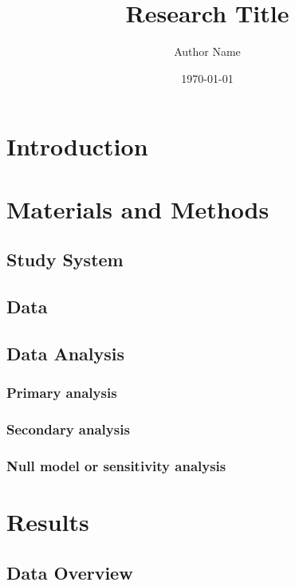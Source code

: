 \documentclass[a4paper,10pt]{article}
\title{Research Title}
\author{Author Name}
\date{\today}
\begin{document}
\maketitle

\begin{abstract}
\end{abstract}

\section{Introduction}

\section{Materials and Methods}

\subsection{Study System}

\subsection{Data}

\subsection{Data Analysis}

\subsubsection{Primary analysis}

\subsubsection{Secondary analysis}

\subsubsection{Null model or sensitivity analysis}

\section{Results}

\subsection{Data Overview}
\end{document}

